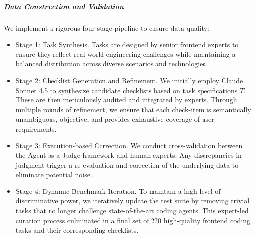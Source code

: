 \subparagraph{\textbf{Data Construction and Validation}}

We implement a rigorous four-stage pipeline to ensure data quality:
\begin{itemize}[leftmargin=1.5em,itemsep=2pt]
\item Stage 1: Task Synthesis. Tasks are designed by senior frontend experts to ensure they reflect real-world engineering challenges while maintaining a balanced distribution across diverse scenarios and technologies.
\item Stage 2: Checklist Generation and Refinement. We initially employ Claude Sonnet 4.5 to synthesize candidate checklists based on task specifications $T$. These are then meticulously audited and integrated by experts. Through multiple rounds of refinement, we ensure that each check-item is semantically unambiguous, objective, and provides exhaustive coverage of user requirements.
\item Stage 3: Execution-based Correction. We conduct cross-validation between the Agent-as-a-Judge framework and human experts. Any discrepancies in judgment trigger a re-evaluation and correction of the underlying data to eliminate potential noise.
\item Stage 4: Dynamic Benchmark Iteration. To maintain a high level of discriminative power, we iteratively update the test suite by removing trivial tasks that no longer challenge state-of-the-art coding agents. This expert-led curation process culminated in a final set of 220 high-quality frontend coding tasks and their corresponding checklists.
\end{itemize}